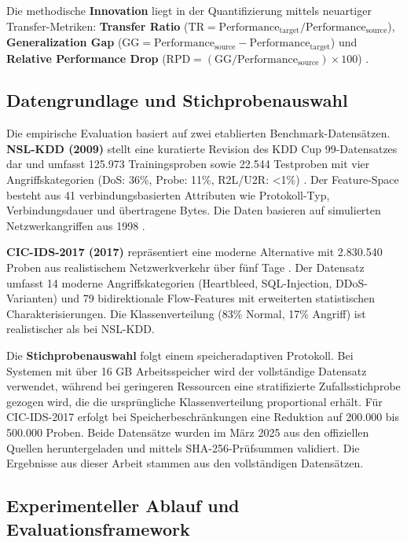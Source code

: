 \documentclass[11pt,a4paper]{article}
\begin{document}
    Die methodische \textbf{Innovation} liegt in der Quantifizierung mittels neuartiger Transfer-Metriken: \textbf{Transfer Ratio} ($\text{TR} = \text{Performance}_{\text{target}} / \text{Performance}_{\text{source}}$), \textbf{Generalization Gap} ($\text{GG} = \text{Performance}_{\text{source}} - \text{Performance}_{\text{target}}$) und \textbf{Relative Performance Drop} ($\text{RPD} = (\text{GG} / \text{Performance}_{\text{source}}) \times 100$) \parencite{Mourouzis2021}.


    \subsection{Datengrundlage und Stichprobenauswahl}

    Die empirische Evaluation basiert auf zwei etablierten Benchmark-Datensätzen. \textbf{NSL-KDD (2009)} stellt eine kuratierte Revision des KDD Cup 99-Datensatzes dar und umfasst 125.973 Trainingsproben sowie 22.544 Testproben mit vier Angriffskategorien (DoS: 36\%, Probe: 11\%, R2L/U2R: <1\%) \parencite{Tavallaee2009}. Der Feature-Space besteht aus 41 verbindungsbasierten Attributen wie Protokoll-Typ, Verbindungsdauer und übertragene Bytes. Die Daten basieren auf simulierten Netzwerkangriffen aus 1998 \parencite{McHugh2000}.

    \textbf{CIC-IDS-2017 (2017)} repräsentiert eine moderne Alternative mit 2.830.540 Proben aus realistischem Netzwerkverkehr über fünf Tage \parencite{Sharafaldin2018}. Der Datensatz umfasst 14 moderne Angriffskategorien (Heartbleed, SQL-Injection, DDoS-Varianten) und 79 bidirektionale Flow-Features mit erweiterten statistischen Charakterisierungen. Die Klassenverteilung (83\% Normal, 17\% Angriff) ist realistischer als bei NSL-KDD.

    Die \textbf{Stichprobenauswahl} folgt einem speicheradaptiven Protokoll. Bei Systemen mit über 16 GB Arbeitsspeicher wird der vollständige Datensatz verwendet, während bei geringeren Ressourcen eine stratifizierte Zufallsstichprobe gezogen wird, die die ursprüngliche Klassenverteilung proportional erhält. Für CIC-IDS-2017 erfolgt bei Speicherbeschränkungen eine Reduktion auf 200.000 bis 500.000 Proben. Beide Datensätze wurden im März 2025 aus den offiziellen Quellen heruntergeladen \parencite{NSLKDD2024,CICIDS2017} und mittels SHA-256-Prüfsummen validiert. Die Ergebnisse aus dieser Arbeit stammen aus den vollständigen Datensätzen.

    \subsection{Experimenteller Ablauf und Evaluationsframework}
\end{document}

